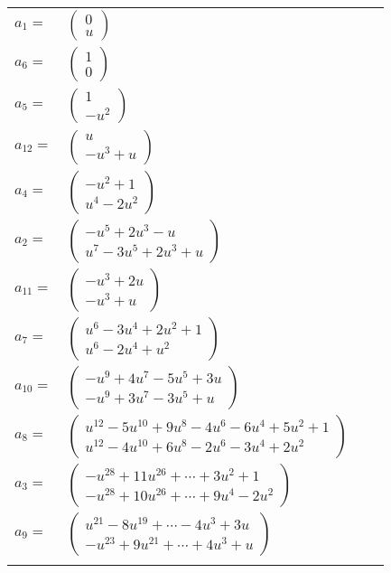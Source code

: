 \documentclass[1p]{elsarticle_modified}
\theoremstyle{definition}
\begin{document}
\begin{tabular}{m{7pt} m{180pt} m{7pt} m{180pt} }
\flushright $a_{1}=$&$\begin{pmatrix}0\\u\end{pmatrix}$ \\
\flushright $a_{6}=$&$\begin{pmatrix}1\\0\end{pmatrix}$ \\
\flushright $a_{5}=$&$\begin{pmatrix}1\\- u^2\end{pmatrix}$ \\
\flushright $a_{12}=$&$\begin{pmatrix}u\\- u^3+u\end{pmatrix}$ \\
\flushright $a_{4}=$&$\begin{pmatrix}- u^2+1\\u^4-2 u^2\end{pmatrix}$ \\
\flushright $a_{2}=$&$\begin{pmatrix}- u^5+2 u^3- u\\u^7-3 u^5+2 u^3+u\end{pmatrix}$ \\
\flushright $a_{11}=$&$\begin{pmatrix}- u^3+2 u\\- u^3+u\end{pmatrix}$ \\
\flushright $a_{7}=$&$\begin{pmatrix}u^6-3 u^4+2 u^2+1\\u^6-2 u^4+u^2\end{pmatrix}$ \\
\flushright $a_{10}=$&$\begin{pmatrix}- u^9+4 u^7-5 u^5+3 u\\- u^9+3 u^7-3 u^5+u\end{pmatrix}$ \\
\flushright $a_{8}=$&$\begin{pmatrix}u^{12}-5 u^{10}+9 u^8-4 u^6-6 u^4+5 u^2+1\\u^{12}-4 u^{10}+6 u^8-2 u^6-3 u^4+2 u^2\end{pmatrix}$ \\
\flushright $a_{3}=$&$\begin{pmatrix}- u^{28}+11 u^{26}+\cdots+3 u^2+1\\- u^{28}+10 u^{26}+\cdots+9 u^4-2 u^2\end{pmatrix}$ \\
\flushright $a_{9}=$&$\begin{pmatrix}u^{21}-8 u^{19}+\cdots-4 u^3+3 u\\- u^{23}+9 u^{21}+\cdots+4 u^3+u\end{pmatrix}$\\&\end{tabular}
\end{document}
